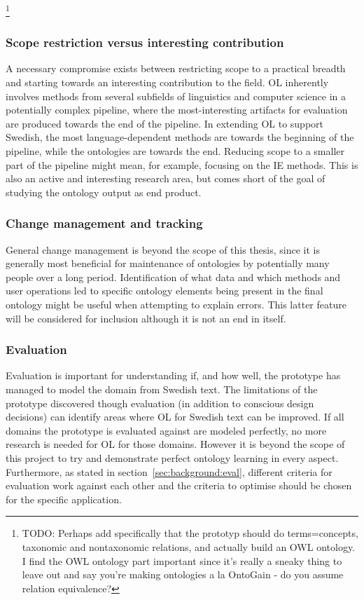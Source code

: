 \documentclass[a4paper]{report}
\newcommand{\todo}[1]{\footnote{{\color{red} TODO: #1}}}
\begin{document}
\todo{Perhaps add specifically that the prototyp should do terms=concepts, taxonomic and nontaxonomic relations, and actually build an OWL ontology. I find the OWL ontology part important since it's really a sneaky thing to leave out and say you're making ontologies a la OntoGain - do you assume relation equivalence?}

\subsubsection{Scope restriction versus interesting contribution}

A necessary compromise exists between restricting scope to a practical breadth and starting towards an interesting contribution to the field.
OL inherently involves methods from several subfields of linguistics and computer science in a potentially complex pipeline, where the most-interesting artifacts for evaluation are produced towards the end of the pipeline.
In extending OL to support Swedish, the most language-dependent methods are towards the beginning of the pipeline, while the ontologies are towards the end.
Reducing scope to a smaller part of the pipeline might mean, for example, focusing on the IE methods.
This is also an active and interesting research area, but comes short of the goal of studying the ontology output as end product.

\subsubsection{Change management and tracking}

General change management is beyond the scope of this thesis, since it is generally most beneficial for maintenance of ontologies by potentially many people over a long period.
Identification of what data and which methods and user operations led to specific ontology elements being present in the final ontology might be useful when attempting to explain errors.
This latter feature will be considered for inclusion although it is not an end in itself.

\subsubsection{Evaluation}

Evaluation is important for understanding if, and how well, the prototype has managed to model the domain from Swedish text.
The limitations of the prototype discovered though evaluation (in addition to conscious design decisions) can identify areas where OL for Swedish text can be improved.
If all domains the prototype is evaluated against are modeled perfectly, no more research is needed for OL for those domains.
However it is beyond the scope of this project to try and demonstrate perfect ontology learning in every aspect.
Furthermore, as stated in section~\ref{sec:background:eval}, different criteria for evaluation work against each other and the criteria to optimise should be chosen for the specific application.
\end{document}
